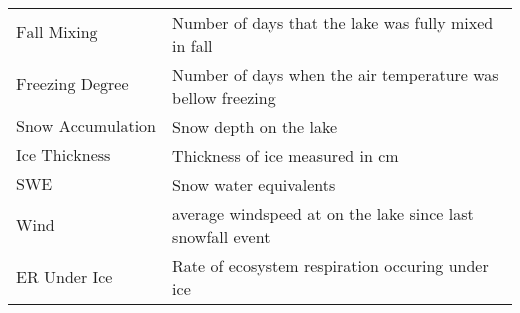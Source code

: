 \documentclass[]{article}
\begin{document}
\begin{longtable}[]{@{}ll@{}}
\begin{minipage}[t]{0.19\columnwidth}
\(\text{Fall Mixing Duration}\)\strut
\end{minipage} & \begin{minipage}[t]{0.75\columnwidth}\raggedright
Number of days that the lake was fully mixed in fall\strut
\end{minipage}\tabularnewline
\begin{minipage}[t]{0.19\columnwidth}\raggedright
\(\text{Freezing Degree Days }\)\strut
\end{minipage} & \begin{minipage}[t]{0.75\columnwidth}\raggedright
Number of days when the air temperature was bellow freezing\strut
\end{minipage}\tabularnewline
\begin{minipage}[t]{0.19\columnwidth}\raggedright
\(\text{Snow Accumulation}\)\strut
\end{minipage} & \begin{minipage}[t]{0.75\columnwidth}\raggedright
Snow depth on the lake\strut
\end{minipage}\tabularnewline
\begin{minipage}[t]{0.19\columnwidth}\raggedright
\(\text{Ice Thickness}\)\strut
\end{minipage} & \begin{minipage}[t]{0.75\columnwidth}\raggedright
Thickness of ice measured in cm\strut
\end{minipage}\tabularnewline
\begin{minipage}[t]{0.19\columnwidth}\raggedright
\(\text{SWE}\)\strut
\end{minipage} & \begin{minipage}[t]{0.75\columnwidth}\raggedright
Snow water equivalents\strut
\end{minipage}\tabularnewline
\begin{minipage}[t]{0.19\columnwidth}\raggedright
\(\text{Wind}\)\strut
\end{minipage} & \begin{minipage}[t]{0.75\columnwidth}\raggedright
average windspeed at on the lake since last snowfall event\strut
\end{minipage}\tabularnewline
\begin{minipage}[t]{0.19\columnwidth}\raggedright
\(\text{ER Under Ice}\)\strut
\end{minipage} & \begin{minipage}[t]{0.75\columnwidth}\raggedright
Rate of ecosystem respiration occuring under ice\strut
\end{minipage}\tabularnewline

\end{longtable}
\end{document}
